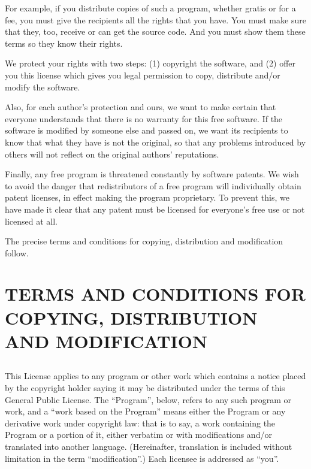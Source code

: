\documentclass[a4paper, 12pt]{article}
\begin{document}
\vspace{0.3cm}

For example, if you distribute copies of such a program, whether gratis or for a fee, you must give the recipients all the rights that you have. You must make sure that they, too, receive or can get the source code. And you must show them these terms so they know their rights.

\vspace{0.3cm}

We protect your rights with two steps: (1) copyright the software, and (2) offer you this license which gives you legal permission to copy, distribute and/or modify the software.

\vspace{0.3cm}

Also, for each author's protection and ours, we want to make certain that everyone understands that there is no warranty for this free software. If the software is modified by someone else and passed on, we want its recipients to know that what they have is not the original, so that any problems introduced by others will not reflect on the original authors' reputations.

\vspace{0.3cm}

Finally, any free program is threatened constantly by software patents. We wish to avoid the danger that redistributors of a free program will individually obtain patent licenses, in effect making the program proprietary. To prevent this, we have made it clear that any patent must be licensed for everyone's free use or not licensed at all.

\vspace{0.3cm}

The precise terms and conditions for copying, distribution and modification follow.

\section*{TERMS AND CONDITIONS FOR COPYING, DISTRIBUTION AND MODIFICATION}

\subsection{}

This License applies to any program or other work which contains a notice placed by the copyright holder saying it may be distributed under the terms of this General Public License. The ``Program'', below, refers to any such program or work, and a ``work based on the Program'' means either the Program or any derivative work under copyright law: that is to say, a work containing the Program or a portion of it, either verbatim or with modifications and/or translated into another language. (Hereinafter, translation is included without limitation in the term ``modification''.) Each licensee is addressed as ``you''.
\end{document}
